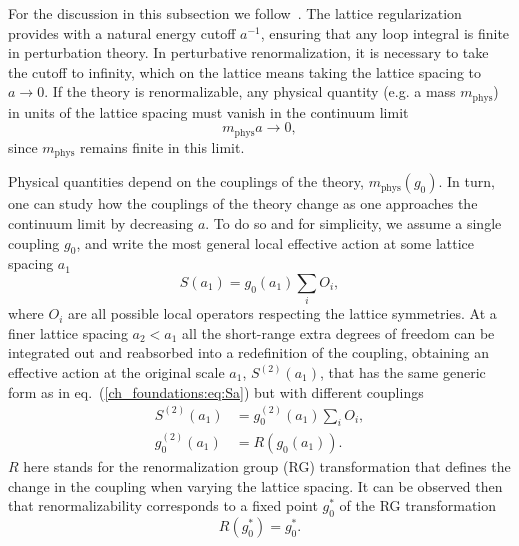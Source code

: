 For the discussion in this subsection we follow~\citep{Hernandez:2009zz}. The lattice regularization provides with a natural energy cutoff $a^{-1}$, ensuring that any loop integral is finite in perturbation theory. In perturbative renormalization, it is necessary to take the cutoff to infinity, which on the lattice means taking the lattice spacing to $a\rightarrow0$. If the theory is renormalizable, any physical quantity (e.g. a mass $m_{\textrm{phys}}$) in units of the lattice spacing must vanish in the continuum limit
\begin{equation}
\label{ch_foundation:eq:ma0}
m_{\textrm{phys}}a\rightarrow0,
\end{equation}
since $m_{\textrm{phys}}$ remains finite in this limit. 

Physical quantities depend on the couplings of the theory, $m_{\textrm{phys}}(g_0)$. In turn, one can study how the couplings of the theory change as one approaches the continuum limit by decreasing $a$. To do so and for simplicity, we assume a single coupling $g_0$, and write the most general local effective action at some lattice spacing $a_1$
\begin{equation}
\label{ch_foundations:eq:Sa}
S(a_1)=g_0(a_1)\sum_i{O}_i,
\end{equation}
where ${O}_i$ are all possible local operators respecting the lattice symmetries. At a finer lattice spacing $a_2<a_1$ all the short-range extra degrees of freedom can be integrated out and reabsorbed into a redefinition of the coupling, obtaining an effective action at the original scale $a_1$, $S^{(2)}(a_1)$, that has the same generic form as in eq.~(\ref{ch_foundations:eq:Sa}) but with different couplings
\begin{align}
S^{(2)}(a_1)&=g_0^{(2)}(a_1)\sum_iO_i, \\
g_0^{(2)}(a_1)&=R(g_0(a_1)).
\end{align}
$R$ here stands for the renormalization group (RG) transformation that defines the change in the coupling when varying the lattice spacing. It can be observed then that renormalizability corresponds to a fixed point $g_0^*$ of the RG transformation
\begin{equation}
R(g_0^*)=g_0^*.
\end{equation}


